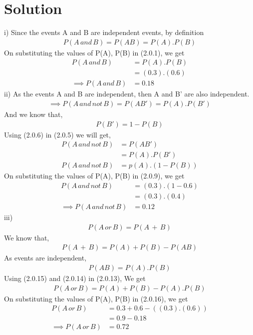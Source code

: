 \documentclass[journal,12pt,twocolumn]{IEEEtran}
\begin{document}
\section{Solution}
i)
Since the events A and B are independent events, by definition
\begin{align}
    P(A\, and\, B) = P(AB) = P(A).P(B)
\end{align}
On substituting the values of P(A), P(B) in (2.0.1), we get
\begin{align}
    P(A\, and\, B) &= P(A).P(B)\\
    &= (0.3).(0.6)\\
    \implies P(A\, and\, B)&=0.18
\end{align}
ii)
As the events A and B are independent, then A and B' are also independent.
\begin{align}   
\implies P(A\, and\,not\, B) =P(AB') = P(A).P(B')
\end{align}
And we know that,
\begin{align}
    P(B')=1-P(B)
\end{align}
Using (2.0.6) in (2.0.5) we will get,
\begin{align}
    P(A\, and\,not\, B) &=P(AB') \\
    &= P(A).P(B')\\
    P(A\, and\,not\, B)&= p(A).(1-P(B))
\end{align}
On substituting the values of P(A), P(B) in (2.0.9), we get
\begin{align}
    P(A\, and\, not\, B) &= (0.3).(1-0.6)\\
    &= (0.3).(0.4)\\
    \implies P(A\, and\, not\, B)&= 0.12
\end{align}
iii)
\begin{align}
    P(A\,or\,B) =P(A\,+\,B)
\end{align}
We know that,
\begin{align}
    P(A\, +\, B) = P(A) + P(B) -P(AB)
\end{align}
As events are independent,
\begin{align}
    P(AB)=P(A).P(B)
\end{align}
Using (2.0.15) and (2.0.14) in (2.0.13), We get
\begin{align}
    P(A\,or\,B) = P(A) + P(B) - P(A).P(B)
\end{align}
On substituting the values of P(A), P(B) in (2.0.16), we get
\begin{align}
    P(A\,or\,B) &= 0.3 + 0.6 -((0.3).(0.6))\\
    &= 0.9-0.18\\
    \implies P(A\,or\,B) &= 0.72
\end{align}
\end{document}
